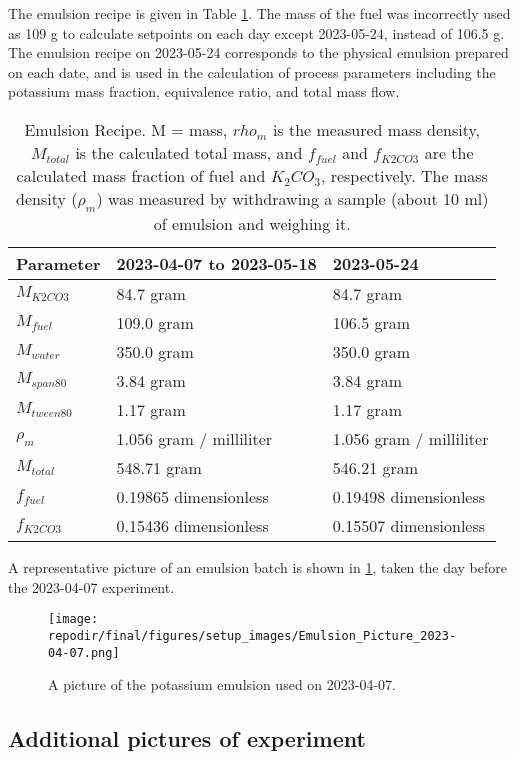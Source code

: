 The emulsion recipe is given in Table \ref{tab:emulsion_parameters}. The mass of the fuel was incorrectly used as 109 g to calculate setpoints on each day except 2023-05-24, instead of 106.5 g. The emulsion recipe on 2023-05-24 corresponds to the physical emulsion prepared on each date, and is used in the calculation of process parameters including the potassium mass fraction, equivalence ratio, and total mass flow. 


\begin{table}[h]
\centering
\begin{tabular}{|l|l|l|}
\hline
\textbf{Parameter} & \textbf{2023-04-07 to 2023-05-18} & \textbf{2023-05-24} \\
\hline
$M_{K2CO3}$ & 84.7 gram & 84.7 gram \\
$M_{fuel}$ & 109.0 gram & 106.5 gram \\
$M_{water}$ & 350.0 gram & 350.0 gram \\
$M_{span80}$ & 3.84 gram & 3.84 gram \\
$M_{tween80}$ & 1.17 gram & 1.17 gram \\
$\rho_m$ & 1.056 gram / milliliter & 1.056 gram / milliliter \\
$M_{total}$ & 548.71 gram & 546.21 gram \\
$f_{fuel}$ & 0.19865 dimensionless & 0.19498 dimensionless \\
$f_{K2CO3}$ & 0.15436 dimensionless & 0.15507 dimensionless \\
\hline
\end{tabular}
\caption{Emulsion Recipe. M = mass, $rho_m$ is the measured mass density, $M_{total}$ is the calculated total mass, and $f_{fuel}$ and $f_{K2CO3}$ are the calculated mass fraction of fuel and $K_2CO_3$, respectively. The mass density ($\rho_m$) was measured by withdrawing a sample (about 10 ml) of emulsion and weighing it.  }


\label{tab:emulsion_parameters}
\end{table}
A representative picture of an emulsion batch is shown in \ref{fig:SI_Emulsion_Picture}, taken the day before the 2023-04-07 experiment. 

\begin{figure}[]
\centering
\texttt{[image: \\repodir/final/figures/setup\_images/Emulsion\_Picture\_2023-04-07.png]}
\caption{A picture of the potassium emulsion used on 2023-04-07. }
\label{fig:SI_Emulsion_Picture}
\end{figure}

\clearpage
\subsection{Additional pictures of experiment}

